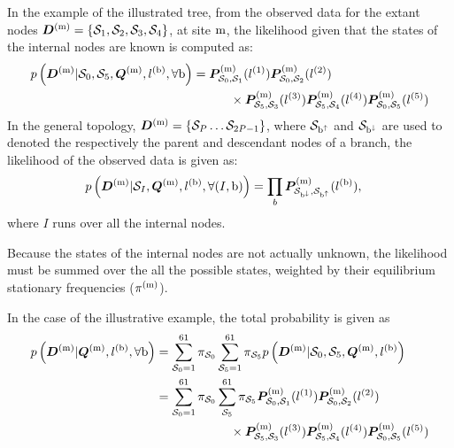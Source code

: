 In the example of the illustrated tree, from the observed data for the extant nodes $\bm{D}^{(\text{m})} = \{ \mathcal{S}_1,\mathcal{S}_2, \mathcal{S}_3, \mathcal{S}_4 \}$, at site $\text{m}$, the \gls{likelihood} given that the states of the internal nodes are known is computed as:
\begin{align}
	p\left(\bm{D}^{(\text{m})}| \mathcal{S}_0, \mathcal{S}_5, \bm{Q}^{(\text{m})}, l^{(\text{b})}, \forall \text{b} \right) & = \bm{P}^{(\text{m})}_{\mathcal{S}_0, \mathcal{S}_1}(l^{(1)})
	\bm{P}^{(\text{m})}_{\mathcal{S}_0, \mathcal{S}_2}(l^{(2)}) \\
	& \quad \quad \quad
	\times \bm{P}^{(\text{m})}_{\mathcal{S}_5, \mathcal{S}_3}(l^{(3)})
	\bm{P}^{(\text{m})}_{\mathcal{S}_5, \mathcal{S}_4}(l^{(4)})
	\bm{P}^{(\text{m})}_{\mathcal{S}_0, \mathcal{S}_5}(l^{(5)}) \notag
\end{align}
In the general topology, $\bm{D}^{(\text{m})} = \{ \mathcal{S}_P \hdots \mathcal{S}_{2P-1} \}$, where $\mathcal{S}_{\text{b}^{\uparrow}}$ and $\mathcal{S}_{\text{b}^{\downarrow}}$ are used to denoted the respectively the parent and descendant nodes of a branch, the \gls{likelihood} of the observed data is given as:
\begin{align}
p\left(\bm{D}^{(\text{m})}| \mathcal{S}_{I}, \bm{Q}^{(\text{m})}, l^{(\text{b})}, \forall (I, \text{b}) \right) & = \prod_{b} \bm{P}^{(\text{m})}_{\mathcal{S}_{\text{b}^{\downarrow}}, \mathcal{S}_{\text{b}^{\uparrow}}}(l^{(\text{b})}),
\end{align}
where $I$ runs over all the internal nodes.

Because the states of the internal nodes are not actually unknown, the \gls{likelihood} must be summed over the all the possible states, weighted by their equilibrium stationary frequencies ($\pi^{(\text{m})}$).

In the case of the illustrative example, the total probability is given as
\begin{align}
	p\left(\bm{D}^{(\text{m})}| \bm{Q}^{(\text{m})}, l^{(\text{b})} , \forall \text{b} \right) & = \sum_{\mathcal{S}_0=1}^{61} \pi_{\mathcal{S}_0} \sum_{\mathcal{S}_5=1}^{61} \pi_{\mathcal{S}_5} p\left(\bm{D}^{(\text{m})}| \mathcal{S}_0, \mathcal{S}_5, \bm{Q}^{(\text{m})}, l^{(\text{b})} \right) \\
	& = \sum_{\mathcal{S}_0=1}^{61} \pi_{\mathcal{S}_0} \sum_{\mathcal{S}_5}^{61} \pi_{\mathcal{S}_5} \bm{P}^{(\text{m})}_{\mathcal{S}_0, \mathcal{S}_1}(l^{(1)})
	\bm{P}^{(\text{m})}_{\mathcal{S}_0, \mathcal{S}_2}(l^{(2)}) \\
	& \qquad \qquad \qquad
	\times \bm{P}^{(\text{m})}_{\mathcal{S}_5, \mathcal{S}_3}(l^{(3)})
	\bm{P}^{(\text{m})}_{\mathcal{S}_5, \mathcal{S}_4}(l^{(4)})
	\bm{P}^{(\text{m})}_{\mathcal{S}_0, \mathcal{S}_5}(l^{(5)})\notag
\end{align}

